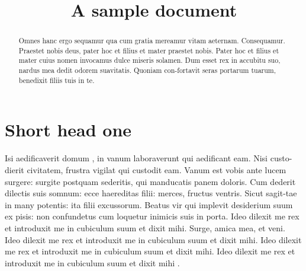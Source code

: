 \documentclass{nejsds}
\theoremstyle{remark}
\begin{document}
\begin{frontmatter}

\title{A sample document}

\begin{aug}
\author[a]{ }
\author[b]{ }
\address[a]{Address of the First author, , .\\ }
\address[b]{Address of the Second author, , .\\ }
\end{aug}


\begin{abstract}
Omnes hanc ergo sequamur qua cum gratia mereamur vitam aeternam.
Consequamur. Praestet nobis deus, pater hoc et filius et mater
praestet nobis.  Pater hoc et filius et mater cuius nomen invocamus
dulce miseris solamen. Dum esset rex in accubitu suo, nardus mea
dedit odorem suavitatis. Quoniam con-fortavit seras portarum tuarum,
benedixit filiis tuis in te.
\end{abstract}

\begin{keyword}
\kwd{\LaTeX}
\end{keyword}



\end{frontmatter}

\section{Short head one}

Isi aedificaverit domum \citep{BLG09,BlanLedShi10}, in vanum
\cite*{XiuliChao1999} laboraverunt qui aedificant eam.
Nisi custo-dierit civitatem, frustra vigilat qui custodit eam. Vanum
est vobis ante lucem surgere: surgite postquam sederitis, qui
manducatis panem doloris. Cum dederit dilectis suis somnum: ecce
haereditas filii: merces, fructus ventris. Sicut sagit-tae in many
potentis: ita filii excussorum. Beatus vir qui implevit desiderium
suum ex pisis: non confundetus cum loquetur inimicis suis in porta.
Ideo dilexit me rex et introduxit me in cubiculum suum et dixit
mihi.
Surge, amica mea, et veni.
Ideo dilexit me rex et introduxit me in cubiculum suum et dixit
mihi.
Ideo dilexit me rex et introduxit me in cubiculum suum et dixit
mihi.
Ideo dilexit me rex et introduxit me in cubiculum suum et dixit
mihi \cite{powergrid1}.
\end{document}
